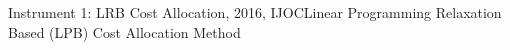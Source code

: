 \documentclass[14pt]{beamer}
\begin{document}
\begin{frame}{Instrument 1: LRB Cost Allocation, {\footnotesize 2016, IJOC}}{Linear Programming Relaxation Based (LPB) Cost Allocation Method}
\end{frame}
\end{document}
